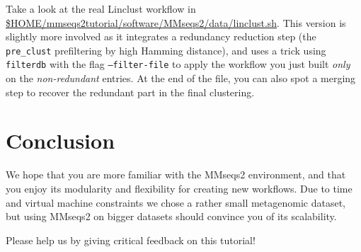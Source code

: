 \documentclass{scrartcl}
\begin{document}
Take a look at the real Linclust workflow in \url{\$HOME/mmseqs2tutorial/software/MMseqs2/data/linclust.sh}. This version is slightly more involved as it integrates a redundancy reduction step (the \texttt{pre\_clust} prefiltering by high Hamming distance), and uses a trick using \texttt{filterdb} with the flag  \texttt{--filter-file} to apply the workflow you just built \textit{only} on the \textit{non-redundant} entries. At the end of the file, you can also spot a merging step to recover the redundant part in the final clustering.

\section{Conclusion}
We hope that you are more familiar with the MMseqs2 environment, and that you enjoy its modularity and flexibility for creating new workflows. Due to time and virtual machine constraints we chose a rather small metagenomic dataset, but using MMseqs2 on bigger datasets should convince you of its scalability.

Please help us by giving critical feedback on this tutorial!



\end{document}
